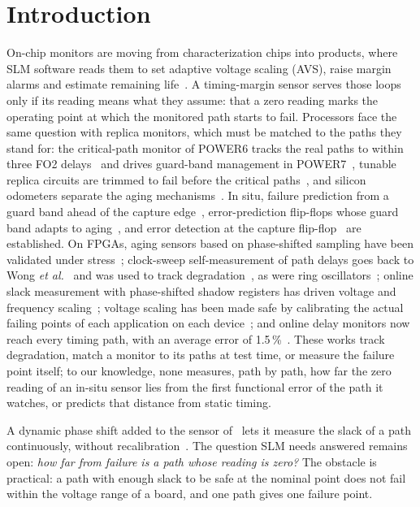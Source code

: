 \documentclass[conference]{IEEEtran}
\begin{document}
\section{Introduction}

On-chip monitors are moving from characterization chips into products, where SLM software reads
them to set adaptive voltage scaling (AVS), raise margin alarms and estimate remaining
life~\cite{kashyap21,niemann20,vargas25,lanzieri24}. A timing-margin sensor serves those loops only
if its reading means what they assume: that a zero reading marks the operating point at which the
monitored path starts to fail. Processors face the same question with replica monitors, which must
be matched to the paths they stand for: the critical-path monitor of POWER6 tracks the real paths to
within three FO2 delays~\cite{drake07} and drives guard-band management in POWER7~\cite{lefurgy11},
tunable replica circuits are trimmed to fail before the critical paths~\cite{tschanz09}, and
silicon odometers separate the aging mechanisms~\cite{keane10}. In situ, failure prediction from a
guard band ahead of the capture edge~\cite{agarwal07}, error-prediction flip-flops whose guard band
adapts to aging~\cite{martins11}, and error detection at the capture flip-flop~\cite{razor04} are
established. On FPGAs, aging sensors based on phase-shifted sampling have been validated under
stress~\cite{valdes13,sensible17}; clock-sweep self-measurement of path delays goes back to Wong
\textit{et al.}~\cite{wong09} and was used to track degradation~\cite{stott10}, as were ring
oscillators~\cite{amouri14}; online
slack measurement with phase-shifted shadow registers has driven voltage and frequency
scaling~\cite{levine14}; voltage scaling has been made safe by calibrating the actual failing points
of each application on each device~\cite{ahmed16}; and online delay monitors now reach every timing
path, with an average error of 1.5\,\%~\cite{jiang22}. These works track degradation, match a
monitor to its paths at test time, or measure the failure point itself; to our knowledge, none
measures, path by path, how far the zero reading of an in-situ sensor lies from the first
functional error of the path it watches, or predicts that distance from static timing.

A dynamic phase shift added to the sensor of~\cite{vargas24} lets it measure the slack of a path
continuously, without recalibration~\cite{sbcci25}. The question SLM needs answered remains open:
\emph{how far from failure is a path whose reading is zero?} The obstacle is practical: a path with
enough slack to be safe at the nominal point does not fail within the voltage range of a board, and
one path gives one failure point.
\end{document}
